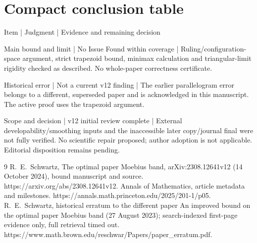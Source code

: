 \documentclass[10pt]{article}
\begin{document}
\section*{Compact conclusion table}
Item | Judgment | Evidence and remaining decision\par
Main bound and limit | No Issue Found within coverage | Ruling/configuration-space argument, strict trapezoid bound, minimax calculation and triangular-limit rigidity checked as described. No whole-paper correctness certificate.\par
Historical error | Not a current v12 finding | The earlier parallelogram error belongs to a different, superseded paper and is acknowledged in this manuscript. The active proof uses the trapezoid argument.\par
Scope and decision | v12 initial review complete | External developability/smoothing inputs and the inaccessible later copy/journal final were not fully verified. No scientific repair proposed; author adoption is not applicable. Editorial disposition remains pending.\par
9 R. E. Schwartz, The optimal paper Moebius band, arXiv:2308.12641v12 (14 October 2024), bound manuscript and source. https://arxiv.org/abs/2308.12641v12. Annals of Mathematics, article metadata and milestones. https://annals.math.princeton.edu/2025/201-1/p05. R. E. Schwartz, historical erratum to the different paper An improved bound on the optimal paper Moebius band (27 August 2023); search-indexed first-page evidence only, full retrieval timed out. https://www.math.brown.edu/reschwar/Papers/paper\_erratum.pdf.\par
\end{document}
